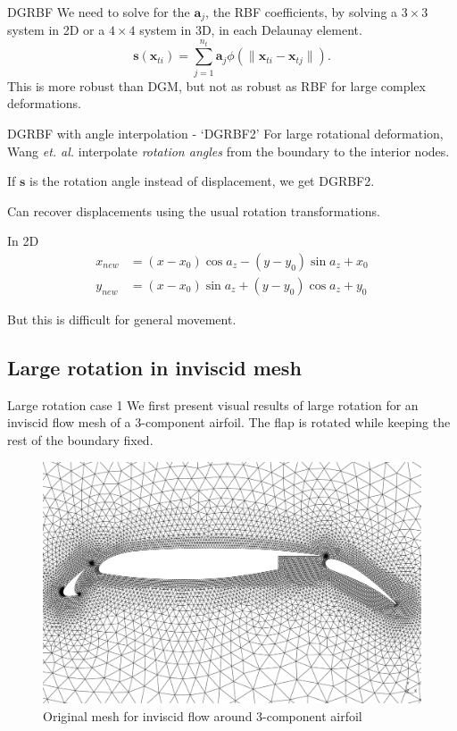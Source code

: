 \documentclass[t,12pt]{beamer}
\let\bld\boldsymbol
\begin{document}
\begin{frame}{DGRBF}
We need to solve for the $\bld{a}_j$, the RBF coefficients, by solving a $3 \times 3$ system in 2D or a $4 \times 4$ system in 3D, in each Delaunay element.
\begin{equation}
\mathbf{s}(\mathbf{x}_{ti}) = \sum_{j=1}^{n_t} \mathbf{a}_j \phi(\lVert\mathbf{x}_{ti} - \mathbf{x}_{tj}\rVert).
\label{eqn:dgrbfsys}
\end{equation}
This is more robust than DGM, but not as robust as RBF for large complex deformations.
\end{frame}

\begin{frame}{DGRBF with angle interpolation - `DGRBF2'}
For large rotational deformation, Wang \emph{et. al.} interpolate \emph{rotation angles} from the boundary to the interior nodes.

If $\bld{s}$ is the rotation angle instead of displacement, we get DGRBF2.

Can recover displacements using the usual rotation transformations.
\begin{exampleblock}{In 2D}
 \begin{align}
 x_{new} &= (x-x_0)\cos a_z - (y-y_0)\sin a_z + x_0 \\
 y_{new} &= (x-x_0)\sin a_z + (y-y_0)\cos a_z + y_0
 \end{align}
\end{exampleblock}
But this is difficult for general movement.
\end{frame}

\subsection{Large rotation in inviscid mesh}

\begin{frame}{Large rotation case 1}
We first present visual results of large rotation for an inviscid flow mesh of a 3-component airfoil. The flap is rotated while keeping the rest of the boundary fixed.
\begin{figure}
	\centering
	\includegraphics[scale=0.16]{3comp-inviscid}
	\caption{Original mesh for inviscid flow around 3-component airfoil}
	\label{fig:wing-inviscid}
\end{figure}
\end{frame}
\end{document}
